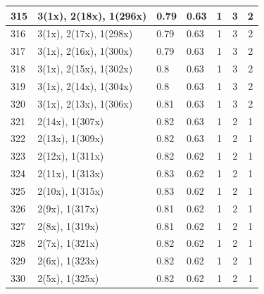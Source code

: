 \begin{small}
\begin{longtable}{|p{0.5cm}|p{9cm}|p{1.3cm}|p{1.3cm}|c|c|c|}
  315 & 3(1x), 2(18x), 1(296x) & \cellcolor{colorBad}  0.79 & \cellcolor{colorBad} 0.63 & 1 & 3 & \cellcolor{colorGood} 2 \\   \hline
  316 & 3(1x), 2(17x), 1(298x) & \cellcolor{colorBad}  0.79 & \cellcolor{colorBad} 0.63 & 1 & 3 & \cellcolor{colorGood} 2 \\   \hline
  317 & 3(1x), 2(16x), 1(300x) & \cellcolor{colorBad}  0.79 & \cellcolor{colorBad} 0.63 & 1 & 3 & \cellcolor{colorGood} 2 \\   \hline
  318 & 3(1x), 2(15x), 1(302x) & \cellcolor{colorBad}  0.8 & \cellcolor{colorBad} 0.63 & 1 & 3 & \cellcolor{colorGood} 2 \\   \hline
  319 & 3(1x), 2(14x), 1(304x) & \cellcolor{colorBad}  0.8 & \cellcolor{colorBad} 0.63 & 1 & 3 & \cellcolor{colorGood} 2 \\   \hline
  320 & 3(1x), 2(13x), 1(306x) & \cellcolor{colorBad}  0.81 & \cellcolor{colorBad} 0.63 & 1 & 3 & \cellcolor{colorGood} 2 \\   \hline
  321 & 2(14x), 1(307x) & \cellcolor{colorBad}  0.82 & \cellcolor{colorBad} 0.63 & 1 & 2 & \cellcolor{colorGood} 1 \\   \hline
  322 & 2(13x), 1(309x) & \cellcolor{colorBad}  0.82 & \cellcolor{colorBad} 0.63 & 1 & 2 & \cellcolor{colorGood} 1 \\   \hline
  323 & 2(12x), 1(311x) & \cellcolor{colorBad}  0.82 & \cellcolor{colorBad} 0.62 & 1 & 2 & \cellcolor{colorGood} 1 \\   \hline
  324 & 2(11x), 1(313x) & \cellcolor{colorBad}  0.83 & \cellcolor{colorBad} 0.62 & 1 & 2 & \cellcolor{colorGood} 1 \\   \hline
  325 & 2(10x), 1(315x) & \cellcolor{colorBad}  0.83 & \cellcolor{colorBad} 0.62 & 1 & 2 & \cellcolor{colorGood} 1 \\   \hline
  326 & 2(9x), 1(317x) & \cellcolor{colorBad}  0.81 & \cellcolor{colorBad} 0.62 & 1 & 2 & \cellcolor{colorGood} 1 \\   \hline
  327 & 2(8x), 1(319x) & \cellcolor{colorBad}  0.81 & \cellcolor{colorBad} 0.62 & 1 & 2 & \cellcolor{colorGood} 1 \\   \hline
  328 & 2(7x), 1(321x) & \cellcolor{colorBad}  0.82 & \cellcolor{colorBad} 0.62 & 1 & 2 & \cellcolor{colorGood} 1 \\   \hline
  329 & 2(6x), 1(323x) & \cellcolor{colorBad}  0.82 & \cellcolor{colorBad} 0.62 & 1 & 2 & \cellcolor{colorGood} 1 \\   \hline
  330 & 2(5x), 1(325x) & \cellcolor{colorBad}  0.82 & \cellcolor{colorBad} 0.62 & 1 & 2 & \cellcolor{colorGood} 1 \\   \hline

\end{longtable}
\end{small}

